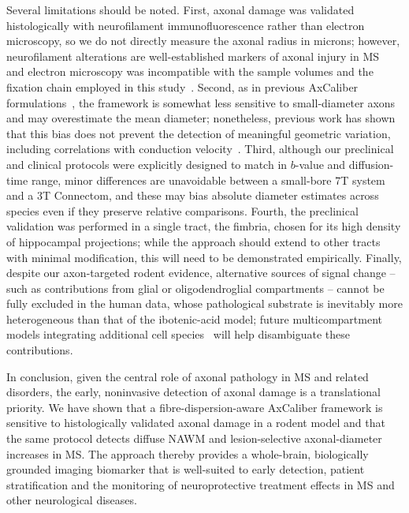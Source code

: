 \documentclass[11pt]{article}
\begin{document}
Several limitations should be noted. First, axonal damage was validated histologically with neurofilament immunofluorescence rather than electron microscopy, so we do not directly measure the axonal radius in microns; however, neurofilament alterations are well-established markers of axonal injury in MS~\cite{petzold2005neurofilament} and electron microscopy was incompatible with the sample volumes and the fixation chain employed in this study~\cite{horowitz2015axon}. Second, as in previous AxCaliber formulations~\cite{assaf2008axcaliber}, the framework is somewhat less sensitive to small-diameter axons and may overestimate the mean diameter; nonetheless, previous work has shown that this bias does not prevent the detection of meaningful geometric variation, including correlations with conduction velocity~\cite{horowitz2015axon}. Third, although our preclinical and clinical protocols were explicitly designed to match in $b$-value and diffusion-time range, minor differences are unavoidable between a small-bore 7T system and a 3T Connectom, and these may bias absolute diameter estimates across species even if they preserve relative comparisons. Fourth, the preclinical validation was performed in a single tract, the fimbria, chosen for its high density of hippocampal projections; while the approach should extend to other tracts with minimal modification, this will need to be demonstrated empirically. Finally, despite our axon-targeted rodent evidence, alternative sources of signal change -- such as contributions from glial or oligodendroglial compartments -- cannot be fully excluded in the human data, whose pathological substrate is inevitably more heterogeneous than that of the ibotenic-acid model; future multicompartment models integrating additional cell species~\cite{ercan2015multimodal} will help disambiguate these contributions.

In conclusion, given the central role of axonal pathology in MS and related disorders, the early, noninvasive detection of axonal damage is a translational priority. We have shown that a fibre-dispersion-aware AxCaliber framework is sensitive to histologically validated axonal damage in a rodent model and that the same protocol detects diffuse NAWM and lesion-selective axonal-diameter increases in MS. The approach thereby provides a whole-brain, biologically grounded imaging biomarker that is well-suited to early detection, patient stratification and the monitoring of neuroprotective treatment effects in MS and other neurological diseases.



\end{document}
